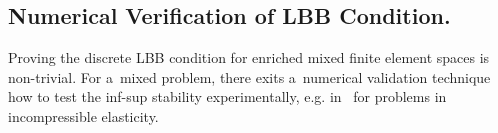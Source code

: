 % 

\subsection{Numerical Verification of LBB Condition.}
\label{sec:numerical_lbb}

Proving the discrete LBB condition for enriched mixed finite element spaces is non-trivial.
For a~mixed problem, there exits a~numerical validation technique how to test
the inf-sup stability experimentally, e.g. in~\cite{chapelle_infsup_1993} for problems in incompressible elasticity.

